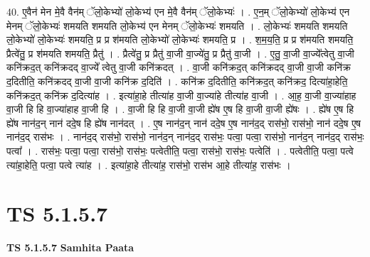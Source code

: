 \documentclass[17pt]{extarticle}
\begin{document}
40. ए॒वैन॑ मेन मे॒वै वैन॑म् ॅलो॒केभ्यो॑ लो॒केभ्य॑ एन मे॒वै वैन॑म् ॅलो॒केभ्यः॑ । . ए॒न॒म् ॅलो॒केभ्यो॑ लो॒केभ्य॑ एन मेनम् ॅलो॒केभ्यः॑ शमयति शमयति लो॒केभ्य॑ एन मेनम् ॅलो॒केभ्यः॑ शमयति । . लो॒केभ्यः॑ शमयति शमयति लो॒केभ्यो॑ लो॒केभ्यः॑ शमयति॒ प्र प्र श॑मयति लो॒केभ्यो॑ लो॒केभ्यः॑ शमयति॒ प्र । . श॒म॒य॒ति॒ प्र प्र श॑मयति शमयति॒ प्रैत्वे॑तु॒ प्र श॑मयति शमयति॒ प्रैतु॑ । . प्रैत्वे॑तु॒ प्र प्रैतु॑ वा॒जी वा॒ज्ये॑तु॒ प्र प्रैतु॑ वा॒जी । . ए॒तु॒ वा॒जी वा॒ज्ये᳚त्वेतु वा॒जी कनि॑क्रद॒त् कनि॑क्रदद् वा॒ज्ये᳚ त्वेतु वा॒जी कनि॑क्रदत् । . वा॒जी कनि॑क्रद॒त् कनि॑क्रदद् वा॒जी वा॒जी कनि॑क्र द॒दितीति॒ कनि॑क्रदद् वा॒जी वा॒जी कनि॑क्र द॒दिति॑ । . कनि॑क्र द॒दितीति॒ कनि॑क्रद॒त् कनि॑क्रद॒ दित्या॑हा॒हेति॒ कनि॑क्रद॒त् कनि॑क्र द॒दित्या॑ह । . इत्या॑हा॒हे तीत्या॑ह वा॒जी वा॒ज्या॑हे तीत्या॑ह वा॒जी । . आ॒ह॒ वा॒जी वा॒ज्या॑हाह वा॒जी हि हि वा॒ज्या॑हाह वा॒जी हि । . वा॒जी हि हि वा॒जी वा॒जी ह्ये॑ष ए॒ष हि वा॒जी वा॒जी ह्ये॑षः । . ह्ये॑ष ए॒ष हि ह्ये॑ष नान॑द॒न् नान॑ ददे॒ष हि ह्ये॑ष नान॑दत् । . ए॒ष नान॑द॒न् नान॑ ददे॒ष ए॒ष नान॑द॒द् रास॑भो॒ रास॑भो॒ नान॑ ददे॒ष ए॒ष नान॑द॒द् रास॑भः । . नान॑द॒द् रास॑भो॒ रास॑भो॒ नान॑द॒न् नान॑द॒द् रास॑भः॒ पत्वा॒ पत्वा॒ रास॑भो॒ नान॑द॒न् नान॑द॒द् रास॑भः॒ पत्वा᳚ । . रास॑भः॒ पत्वा॒ पत्वा॒ रास॑भो॒ रास॑भः॒ पत्वेतीति॒ पत्वा॒ रास॑भो॒ रास॑भः॒ पत्वेति॑ । . पत्वेतीति॒ पत्वा॒ पत्वे त्या॑हा॒हेति॒ पत्वा॒ पत्वे त्या॑ह । . इत्या॑हा॒हे तीत्या॑ह॒ रास॑भो॒ रास॑भ आ॒हे तीत्या॑ह॒ रास॑भः । \newline
\pagebreak
{}

\section{ TS 5.1.5.7 }

\textbf{TS 5.1.5.7 } \newline
\textbf{Samhita Paata} \newline
\end{document}
